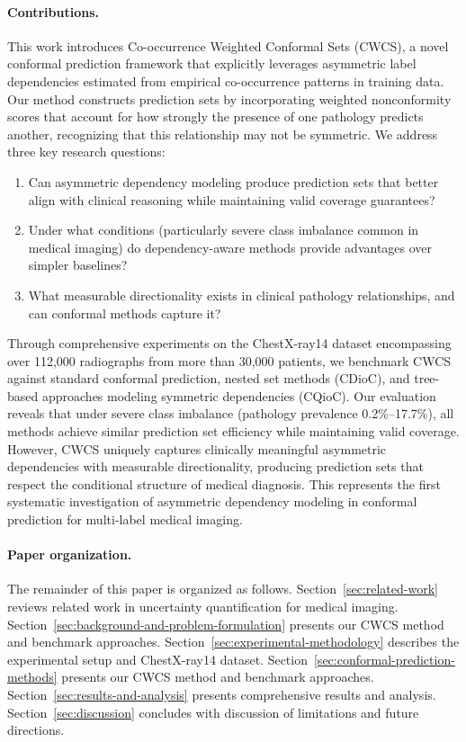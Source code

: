 \paragraph{Contributions.}
This work introduces Co-occurrence Weighted Conformal Sets (CWCS), a novel conformal prediction framework that explicitly leverages asymmetric label dependencies estimated from empirical co-occurrence patterns in training data.
Our method constructs prediction sets by incorporating weighted nonconformity scores that account for how strongly the presence of one pathology predicts another, recognizing that this relationship may not be symmetric.
We address three key research questions:
\begin{enumerate}
    \item Can asymmetric dependency modeling produce prediction sets that better align with clinical reasoning while maintaining valid coverage guarantees?
    \item Under what conditions (particularly severe class imbalance common in medical imaging) do dependency-aware methods provide advantages over simpler baselines?
    \item What measurable directionality exists in clinical pathology relationships, and can conformal methods capture it?
\end{enumerate}

Through comprehensive experiments on the ChestX-ray14 dataset encompassing over 112,000 radiographs from more than 30,000 patients, we benchmark CWCS against standard conformal prediction, nested set methods (CDioC), and tree-based approaches modeling symmetric dependencies (CQioC).
Our evaluation reveals that under severe class imbalance (pathology prevalence 0.2\%--17.7\%), all methods achieve similar prediction set efficiency while maintaining valid coverage.
However, CWCS uniquely captures clinically meaningful asymmetric dependencies with measurable directionality, producing prediction sets that respect the conditional structure of medical diagnosis.
This represents the first systematic investigation of asymmetric dependency modeling in conformal prediction for multi-label medical imaging.

\paragraph{Paper organization.}
The remainder of this paper is organized as follows.
Section~\ref{sec:related-work} reviews related work in uncertainty quantification for medical imaging.
Section~\ref{sec:background-and-problem-formulation} presents our CWCS method and benchmark approaches.
Section~\ref{sec:experimental-methodology} describes the experimental setup and ChestX-ray14 dataset.
Section~\ref{sec:conformal-prediction-methods} presents our CWCS method and benchmark approaches.
Section~\ref{sec:results-and-analysis} presents comprehensive results and analysis.
Section~\ref{sec:discussion} concludes with discussion of limitations and future directions.
